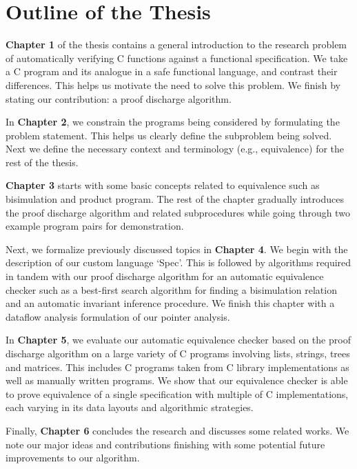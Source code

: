 \section*{Outline of the Thesis}
\label{sec:outlinethesis}
\textbf{Chapter 1} of the thesis contains a general introduction to the research problem of automatically verifying C functions against a functional specification.
We take a C program and its analogue in a safe functional language, and contrast their differences. This helps us motivate the need to solve this problem.
We finish by stating our contribution: a proof discharge algorithm.

In \textbf{Chapter 2}, we constrain the programs being considered by formulating the problem statement. This helps us clearly define the
subproblem being solved. Next we define the necessary context and terminology (e.g., equivalence) for the rest of the thesis.

\textbf{Chapter 3} starts with some basic concepts related to equivalence such as bisimulation and product program.
The rest of the chapter gradually introduces the proof discharge algorithm and related subprocedures while
going through two example program pairs for demonstration.

Next, we formalize previously discussed topics in \textbf{Chapter 4}. We begin with the description of our custom language `Spec'. This is followed by
algorithms required in tandem with our proof discharge algorithm for an automatic equivalence checker such as a best-first search algorithm
for finding a bisimulation relation and an automatic invariant inference procedure. We finish this chapter with a dataflow analysis formulation
of our pointer analysis.

In \textbf{Chapter 5}, we evaluate our automatic equivalence checker based on the proof discharge algorithm on a large variety of C programs involving
lists, strings, trees and matrices.
This includes C programs taken from C library implementations as well as manually written programs. We show that our equivalence checker is able
to prove equivalence of a single specification with multiple of C implementations, each varying in its data layouts and algorithmic
strategies.

Finally, \textbf{Chapter 6} concludes the research and discusses some related works. We note our major ideas and contributions finishing with
some potential future improvements to our algorithm.